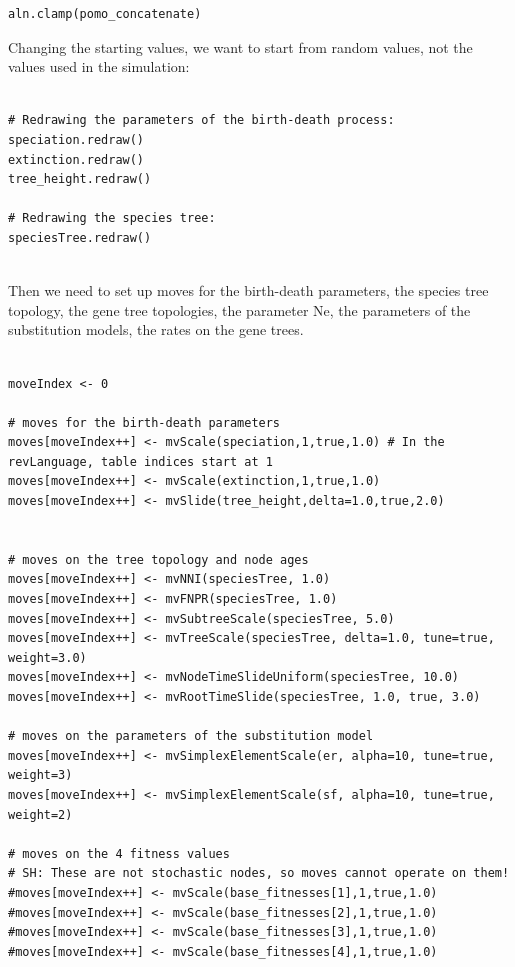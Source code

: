 \documentclass[11pt]{article}
\begin{document}
{\begin{framed}
{\begin{snugshade*}
\begin{lstlisting}
aln.clamp(pomo_concatenate)
\end{lstlisting}
\end{snugshade*}}

Changing the starting values, we want to start from random values, not the values used in the simulation:

 {\tt \begin{snugshade*}
\begin{lstlisting}

# Redrawing the parameters of the birth-death process:
speciation.redraw()
extinction.redraw()
tree_height.redraw()

# Redrawing the species tree:
speciesTree.redraw()


\end{lstlisting}
\end{snugshade*}}


Then we need to set up moves for the birth-death parameters, the species tree topology, the gene tree topologies, the parameter Ne, the parameters of the substitution models, the rates on the gene trees.
 {\tt \begin{snugshade*}
\begin{lstlisting}

moveIndex <- 0

# moves for the birth-death parameters
moves[moveIndex++] <- mvScale(speciation,1,true,1.0) # In the revLanguage, table indices start at 1
moves[moveIndex++] <- mvScale(extinction,1,true,1.0)
moves[moveIndex++] <- mvSlide(tree_height,delta=1.0,true,2.0)


# moves on the tree topology and node ages
moves[moveIndex++] <- mvNNI(speciesTree, 1.0)
moves[moveIndex++] <- mvFNPR(speciesTree, 1.0)
moves[moveIndex++] <- mvSubtreeScale(speciesTree, 5.0)
moves[moveIndex++] <- mvTreeScale(speciesTree, delta=1.0, tune=true, weight=3.0)
moves[moveIndex++] <- mvNodeTimeSlideUniform(speciesTree, 10.0)
moves[moveIndex++] <- mvRootTimeSlide(speciesTree, 1.0, true, 3.0)

# moves on the parameters of the substitution model
moves[moveIndex++] <- mvSimplexElementScale(er, alpha=10, tune=true, weight=3) 
moves[moveIndex++] <- mvSimplexElementScale(sf, alpha=10, tune=true, weight=2) 

# moves on the 4 fitness values
# SH: These are not stochastic nodes, so moves cannot operate on them!
#moves[moveIndex++] <- mvScale(base_fitnesses[1],1,true,1.0)
#moves[moveIndex++] <- mvScale(base_fitnesses[2],1,true,1.0)
#moves[moveIndex++] <- mvScale(base_fitnesses[3],1,true,1.0)
#moves[moveIndex++] <- mvScale(base_fitnesses[4],1,true,1.0)


\end{lstlisting}
\end{snugshade*}}
\end{framed}}
\end{document}
